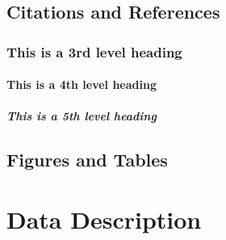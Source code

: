 \documentclass[a4paper,num-refs]{oup-contemporary}
\begin{document}
\subsection{Citations and References}
\subsubsection{This is a 3rd level heading}
\paragraph{This is a 4th level heading}
\subparagraph{This is a 5th level heading}

\subsection{Figures and Tables}




\section{Data Description}


\end{document}
